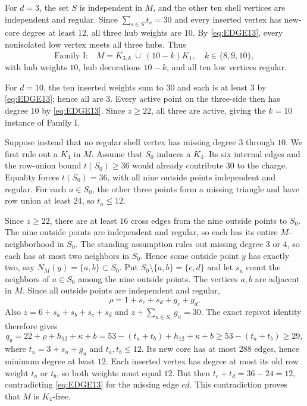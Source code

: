 For $d=3$, the set $S$ is independent in $M$, and the other ten shell vertices are independent and regular. Since $\sum_{s\in S}t_s=30$ and every inserted vertex has new-core degree at least $12$, all three hub weights are $10$. By \cref{eq:EDGE13}, every nonisolated low vertex meets all three hubs. Thus
\[
\text{Family I:}\quad
M=K_{3,k}\ \dot\cup\ (10-k)K_1,\quad
k\in\{8,9,10\},
\]
with hub weights $10$, hub decorations $10-k$, and all ten low vertices regular.

For $d=10$, the ten inserted weights sum to $30$ and each is at least $3$ by \cref{eq:EDGE13}; hence all are $3$. Every active point on the three-side then has degree $10$ by \cref{eq:EDGE13}. Since $z\geq22$, all three are active, giving the $k=10$ instance of Family I.

Suppose instead that no regular shell vertex has missing degree $3$ through $10$. We first rule out a $K_4$ in $M$. Assume that $S_0$ induces a $K_4$. Its six internal edges and the row-union bound $t(S_0)\geq36$ would already contribute $30$ to the charge. Equality forces $t(S_0)=36$, with all nine outside points independent and regular. For each $a\in S_0$, the other three points form a missing triangle and have row union at least $24$, so $t_a\leq12$.

Since $z\geq22$, there are at least $16$ cross edges from the nine outside points to $S_0$. The nine outside points are independent and regular, so each has its entire $M$-neighborhood in $S_0$. The standing assumption rules out missing degree $3$ or $4$, so each has at most two neighbors in $S_0$. Hence some outside point $y$ has exactly two, say $N_M(y)=\{a,b\}\subset S_0$. Put $S_0\setminus\{a,b\}=\{c,d\}$ and let $s_u$ count the neighbors of $u\in S_0$ among the nine outside points. The vertices $a,b$ are adjacent in $M$. Since all outside points are independent and regular,
\[
\rho=1+s_c+s_d+g_c+g_d.
\]
Also $z=6+s_a+s_b+s_c+s_d$ and $z+\sum_{u\in S_0}g_u=30$. The exact repivot identity therefore gives
\[
q_y=22+\rho+h_{12}+\kappa+b
=53-(t_a+t_b)+h_{12}+\kappa+b
\geq53-(t_a+t_b)\geq29,
\]
where $t_u=3+s_u+g_u$ and $t_a,t_b\leq12$. Its new core has at most $288$ edges, hence minimum degree at least $12$. Each inserted vertex has degree at most its old row weight $t_a$ or $t_b$, so both weights must equal $12$. But then $t_c+t_d=36-24=12$, contradicting \cref{eq:EDGE13} for the missing edge $cd$. This contradiction proves that $M$ is $K_4$-free.

